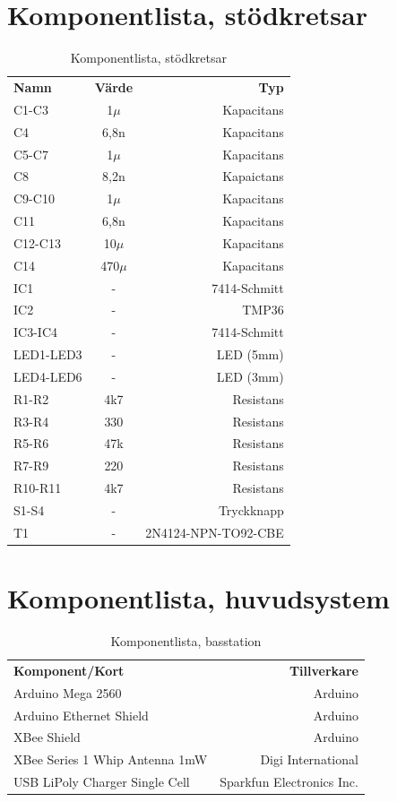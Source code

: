 \documentclass[a4paper,11pt]{article}
\begin{document}
\section{Komponentlista, stödkretsar}

\begin{table}[h]
\centering
	\begin{tabular}{|l|c|r|}
	{\bf Namn} & {\bf Värde} & {\bf Typ} \\
	C1-C3			& 1$\mu$	& Kapacitans \\
	C4			& 6,8n		& Kapacitans \\		
	C5-C7			& 1$\mu$	& Kapacitans \\
	C8			& 8,2n		& Kapaictans \\
	C9-C10			& 1$\mu$	& Kapacitans \\
	C11			& 6,8n		& Kapacitans \\
	C12-C13			& 10$\mu$	& Kapacitans \\
	C14			& 470$\mu$	& Kapacitans \\
	IC1			& -		& 7414-Schmitt \\
	IC2			& -		& TMP36 \\
	IC3-IC4			& -		& 7414-Schmitt \\
	LED1-LED3		& -		& LED (5mm) \\
	LED4-LED6		& -		& LED (3mm) \\
	R1-R2			& 4k7		& Resistans \\
	R3-R4			& 330		& Resistans \\
	R5-R6			& 47k		& Resistans \\
	R7-R9			& 220		& Resistans \\
	R10-R11			& 4k7		& Resistans \\
	S1-S4			& -		& Tryckknapp \\
	T1                      & -		& 2N4124-NPN-TO92-CBE \\
	\end{tabular}
\caption{Komponentlista, stödkretsar}
\label{tab:komponenttable}
\end{table}
\pagebreak

\section{Komponentlista, huvudsystem}

\begin{table}[h]
\centering
	\begin{tabular}{|l|r|}
	{\bf Komponent/Kort} & {\bf Tillverkare} \\
	Arduino Mega 2560                  & Arduino \\
	Arduino Ethernet Shield            & Arduino \\
	XBee Shield                        & Arduino \\
	XBee Series 1 Whip Antenna 1mW     & Digi International \\
	USB LiPoly Charger Single Cell     & Sparkfun Electronics Inc. \\
	\end{tabular}
\caption{Komponentlista, basstation}
\label{tab:korttable_bas}
\end{table}
\end{document}
